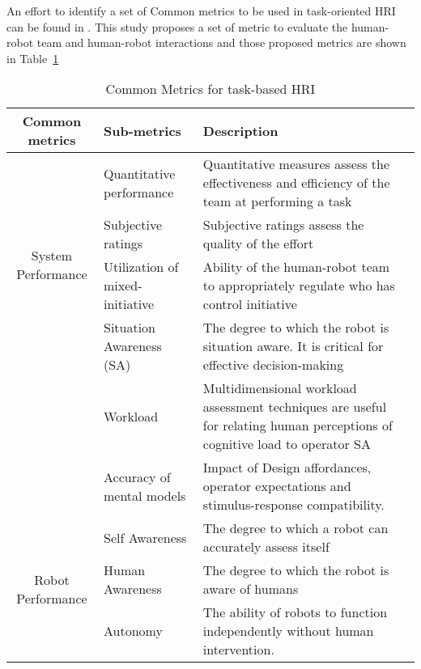  An effort to identify a set of Common metrics to be used in task-oriented HRI can be found in \cite{Steinfeld2006}. This study proposes a set of metric to evaluate the human-robot team and human-robot interactions and those proposed metrics are shown in Table~\ref{table:hri_metrics}

\begin{table}[H]
\centering
\small
\caption{Common Metrics for task-based HRI}
\label{table:hri_metrics}
\begin{tabularx}{400pt}{c*3{X}}
\toprule
  \textbf{Common metrics} & \textbf{Sub-metrics} 
                          & \textbf{Description}
  \tabularnewline \midrule
  
  \multirow{4}{*}{System Performance} & Quantitative performance & Quantitative measures assess the
effectiveness and efficiency of the team at performing a task \\
                                      & Subjective ratings & Subjective ratings assess the quality
of the effort \\
                                      & Utilization of mixed-initiative & Ability of the human-robot team to appropriately regulate who has control initiative 
                                          \tabularnewline\midrule
                                          
  \multirow{4}{*}{Operator Performance} & Situation Awareness (SA) & The degree to which the robot is situation aware. It is critical for effective decision-making \\
                                      & Workload & Multidimensional workload assessment techniques are useful for relating human perceptions of cognitive load to operator SA \\
                                      & Accuracy of mental models & Impact of Design affordances, operator expectations and stimulus-response compatibility.
                                          \tabularnewline\midrule
  
  \multirow{4}{*}{Robot Performance} & Self Awareness & The degree to which a robot can accurately
assess itself \\
                                      & Human Awareness & The degree to which the robot is aware of humans \\
                                      & Autonomy & The ability of robots to function independently without human intervention.
                                          \tabularnewline                                
                                         
  										\bottomrule
\end{tabularx}
\end{table}


